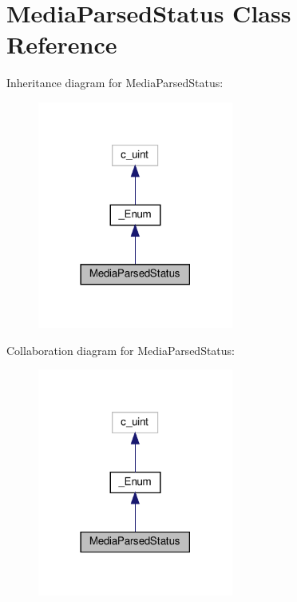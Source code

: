 \hypertarget{classvlc_1_1_media_parsed_status}{}\section{Media\+Parsed\+Status Class Reference}
\label{classvlc_1_1_media_parsed_status}


Inheritance diagram for Media\+Parsed\+Status\+:
\nopagebreak
\begin{figure}[H]
\begin{center}
\leavevmode
\includegraphics[width=182pt]{classvlc_1_1_media_parsed_status__inherit__graph}
\end{center}
\end{figure}


Collaboration diagram for Media\+Parsed\+Status\+:
\nopagebreak
\begin{figure}[H]
\begin{center}
\leavevmode
\includegraphics[width=182pt]{classvlc_1_1_media_parsed_status__coll__graph}
\end{center}
\end{figure}
